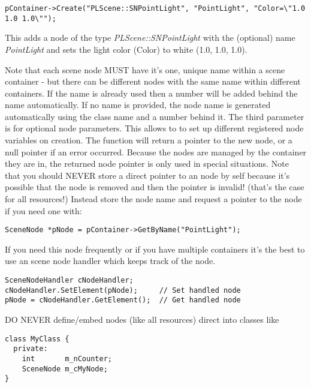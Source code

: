 \begin{lstlisting}[caption=Creating a new scene node instance]
pContainer->Create("PLScene::SNPointLight", "PointLight", "Color=\"1.0 1.0 1.0\"");
\end{lstlisting}

This adds a node of the type \emph{PLScene::SNPointLight} with the (optional) name \emph{PointLight} and sets the light color (Color) to white (1.0, 1.0, 1.0).

Note that each scene node MUST have it's one, unique name within a scene container - but there can be different nodes with the same name within different containers. If the name is already used then a number will be added behind the name automatically. If no name is provided, the node name is generated automatically using the class name and a number behind it. The third parameter is for optional node parameters. This allows to to set up different registered node variables on creation. The function will return a pointer to the new node, or a null pointer if an error occurred. Because the nodes are managed by the container they are in, the returned node pointer is only used in special situations. Note that you should NEVER store a direct pointer to an node by self because it's possible that the node is removed and then the pointer is invalid! (that's the case for all resources!) Instead store the node name and request a pointer to the node if you need one with:

\begin{lstlisting}[caption=Requesting a scene node by name]
SceneNode *pNode = pContainer->GetByName("PointLight");
\end{lstlisting}

If you need this node frequently or if you have multiple containers it's the best to use an scene node handler which keeps track of the node.

\begin{lstlisting}[caption=Scene node handler]
SceneNodeHandler cNodeHandler;
cNodeHandler.SetElement(pNode);     // Set handled node
pNode = cNodeHandler.GetElement();  // Get handled node
\end{lstlisting}

DO NEVER define/embed nodes (like all resources) direct into classes like

\begin{lstlisting}[caption=Invalid scene node instance usage]
class MyClass {
  private:
    int       m_nCounter;
    SceneNode m_cMyNode;
}
\end{lstlisting}

